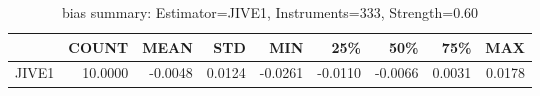 \begin{table}[ht]
\centering
\caption{bias summary: Estimator=JIVE1, Instruments=333, Strength=0.60}
\begin{tabular}{lrrrrrrrr}
\toprule
 & COUNT & MEAN & STD & MIN & 25\% & 50\% & 75\% & MAX \\
\midrule
JIVE1 & 10.0000 & -0.0048 & 0.0124 & -0.0261 & -0.0110 & -0.0066 & 0.0031 & 0.0178 \\
\bottomrule
\end{tabular}
\end{table}
